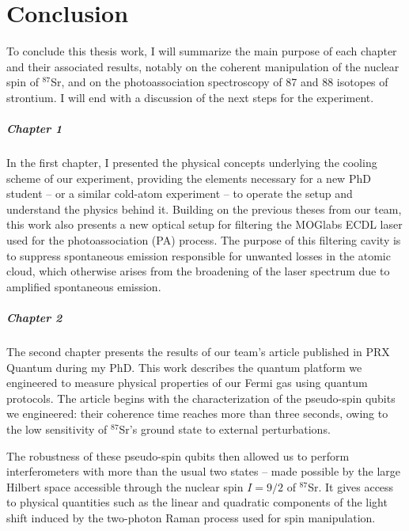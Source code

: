 \chapter*{Conclusion}
To conclude this thesis work, I will summarize the main purpose of each chapter and their associated results, notably
on the coherent manipulation of the nuclear spin of $^{87}$Sr, and on the photoassociation spectroscopy of 87 and 88
isotopes of strontium. I will end with a discussion of the next steps for the experiment.

\paragraph{Chapter 1}
In the first chapter, I presented the physical concepts underlying the cooling scheme of our experiment, 
providing the elements necessary for a new PhD student -- or a similar cold-atom experiment -- to operate 
the setup and understand the physics behind it. Building on the previous theses from our team, this work 
also presents a new optical setup for filtering the MOGlabs ECDL laser used for the photoassociation (PA) 
process. The purpose of this filtering cavity is to suppress spontaneous emission responsible for unwanted
losses in the atomic cloud, which otherwise arises from the broadening of the laser spectrum due to amplified spontaneous emission.

\paragraph{Chapter 2}
The second chapter presents the results of our team's article published in PRX Quantum during my PhD. This 
work describes the quantum platform we engineered to measure physical properties of our Fermi gas using 
quantum protocols. The article begins with the characterization of the pseudo-spin qubits we 
engineered: their coherence time reaches more than three seconds, owing to the low sensitivity of 
$^{87}$Sr's ground state to external perturbations.

The robustness of these pseudo-spin qubits then allowed us to perform interferometers with more than the usual two states
 -- made possible by the large Hilbert space accessible through the nuclear spin $I = 9/2$ 
of $^{87}$Sr. It gives access to physical quantities such as the linear and quadratic components of the 
light shift induced by the two-photon Raman process used for spin manipulation.


